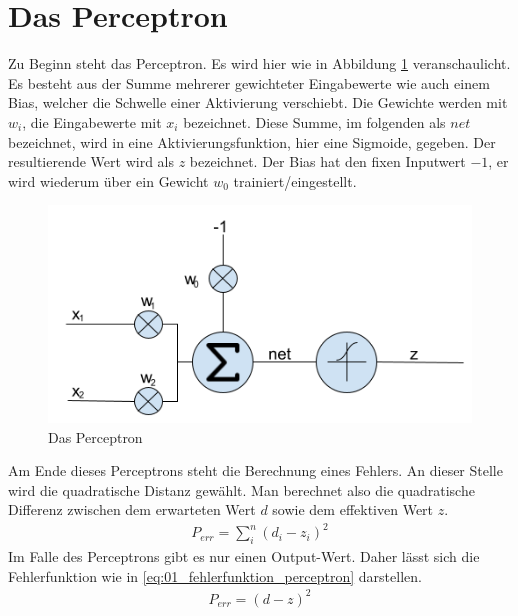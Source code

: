 \section{Das Perceptron}
Zu Beginn steht das Perceptron. Es wird hier wie in Abbildung \ref{fig:04_perceptron} veranschaulicht.
Es besteht aus der Summe mehrerer gewichteter Eingabewerte wie auch einem Bias, welcher
die Schwelle einer Aktivierung verschiebt. Die Gewichte werden mit $w_i$, die Eingabewerte mit $x_i$ bezeichnet.
Diese Summe, im folgenden als $net$ bezeichnet, wird in eine Aktivierungsfunktion,
hier eine Sigmoide, gegeben. Der resultierende Wert wird als $z$ bezeichnet. Der Bias hat den fixen Inputwert $-1$,
er wird wiederum über ein Gewicht $w_0$ trainiert/eingestellt.

\begin{figure}[h!]
    \begin{center}
        \includegraphics[width=0.6\linewidth]{../common/01_perceptron/00_resources/00_perceptron.png}
    \end{center}
    \caption{Das Perceptron}
    \label{fig:04_perceptron}
\end{figure}

Am Ende dieses Perceptrons steht die Berechnung eines Fehlers. An dieser Stelle wird die quadratische Distanz gewählt.
Man berechnet also die quadratische Differenz zwischen dem erwarteten Wert $d$ sowie dem effektiven Wert $z$.
\begin{align}
    P_{err} = \sum_i^n(d_i - z_i)^2
\end{align}
Im Falle des Perceptrons gibt es nur einen Output-Wert. Daher lässt sich die Fehlerfunktion wie in \ref{eq:01_fehlerfunktion_perceptron}
darstellen.
\begin{align}
    P_{err} = (d - z)^2\label{eq:01_fehlerfunktion_perceptron}
\end{align}

